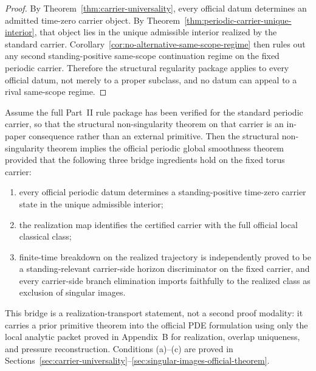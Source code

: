 \begin{proof}
By Theorem~\ref{thm:carrier-universality}, every official datum determines an admitted
time-zero carrier object. By Theorem~\ref{thm:periodic-carrier-unique-interior}, that object lies in
the unique admissible interior realized by the standard carrier. Corollary~\ref{cor:no-alternative-same-scope-regime}
then rules out any second standing-positive same-scope continuation regime on the fixed periodic
carrier. Therefore the structural regularity package applies to every official datum, not merely to a
proper subclass, and no datum can appeal to a rival same-scope regime.
\end{proof}


\begin{lemma}\label{lem:bridge-sufficiency-partIII}
Assume the full Part~II rule package has been verified for the standard periodic carrier, so that the
structural non-singularity theorem on that carrier is an in-paper consequence rather than an external
primitive. Then the structural non-singularity theorem implies the official periodic global smoothness
theorem provided that the following three bridge ingredients hold on the fixed torus carrier:
\begin{enumerate}[label=(\alph*), leftmargin=2.2em]
\item every official periodic datum determines a standing-positive time-zero carrier state in the unique admissible interior;
\item the realization map identifies the certified carrier with the full official local classical class;
\item finite-time breakdown on the realized trajectory is independently proved to be a standing-relevant carrier-side horizon discriminator on the fixed carrier, and every carrier-side branch elimination imports faithfully to the realized class as exclusion of singular images.
\end{enumerate}
This bridge is a realization-transport statement, not a second proof modality: it carries a prior
primitive theorem into the official PDE formulation using only the local analytic packet proved in
Appendix~B for realization, overlap uniqueness, and pressure reconstruction.
Conditions (a)--(c) are proved in Sections~\ref{sec:carrier-universality}--\ref{sec:singular-images-official-theorem}.
\end{lemma}


